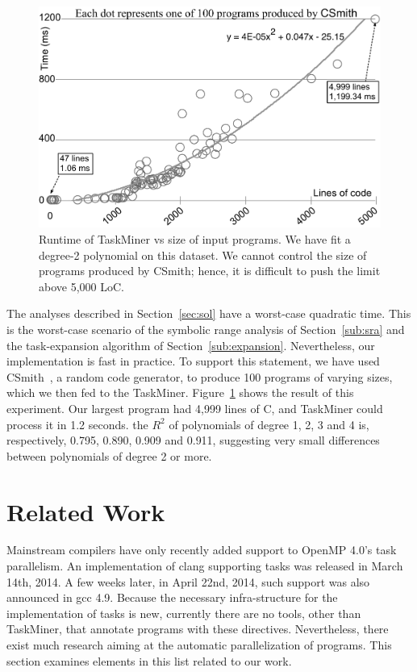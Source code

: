 \documentclass[sigplan,10pt,screen]{acmart}
\newcommand\Taskminer{\mbox{\textsf{TaskMiner}}}
\begin{document}
\begin{figure}[htb]
\begin{center}
\includegraphics[width=0.9\columnwidth]{images/TM_Runtime}
\caption{Runtime of \Taskminer{} vs size of input programs.
We have fit a degree-2 polynomial on this dataset.
We cannot control the size of programs produced by CSmith; hence, it is
difficult to push the limit above 5,000 LoC.}
\label{fig:TM_Runtime}
\end{center}
\end{figure}

The analyses described in Section~\ref{sec:sol} have a worst-case quadratic time.
This is the worst-case scenario of the symbolic range analysis of
Section~\ref{sub:sra} and the task-expansion algorithm of
Section~\ref{sub:expansion}.
Nevertheless, our implementation is fast in practice.
To support this statement, we have used \textsf{CSmith}~\cite{Yang11}, a random
code generator, to produce 100 programs of varying sizes, which we then fed to
the \Taskminer.
Figure~\ref{fig:TM_Runtime} shows the result of this experiment.
Our largest program had 4,999 lines of C, and \Taskminer{} could process it
in 1.2 seconds.
the $R^2$ of polynomials of degree 1, 2, 3 and 4 is, respectively, 0.795,
0.890, 0.909 and 0.911, suggesting very small differences between polynomials
of degree 2 or more.

\section{Related Work}
\label{sec:rw}

Mainstream compilers have only recently added support to OpenMP 4.0's task
parallelism.
An implementation of \textsf{clang} supporting tasks was released in March 14th,
2014.
A few weeks later, in April 22nd, 2014, such support was also announced in
\textsf{gcc} 4.9.
Because the necessary infra-structure for the implementation of tasks is
new, currently there are no tools, other than \Taskminer,
that annotate programs with these directives.
Nevertheless, there exist much research aiming at the automatic
parallelization of programs.
This section examines elements in this list related to our
work.
\end{document}
